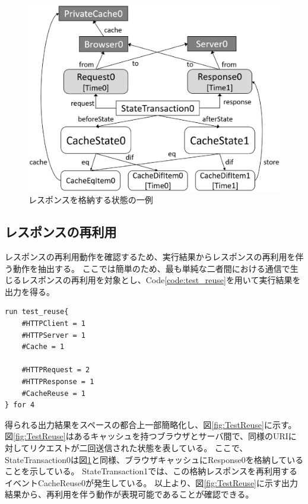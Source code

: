 \documentclass[12pt,a4paper]{jbook}
\begin{document}
\begin{figure}[htb]
\centering
\includegraphics[width=450pt]{./fig/TestStore.eps}
\caption{レスポンスを格納する状態の一例}
\label{fig:TestStore}
\end{figure}

\subsection{レスポンスの再利用}
レスポンスの再利用動作を確認するため、実行結果からレスポンスの再利用を伴う動作を抽出する。
ここでは簡単のため、最も単純な二者間における通信で生じるレスポンスの再利用を対象とし、Code\ref{code:test_reuse}を用いて実行結果を出力を得る。

\begin{lstlisting}[caption=レスポンスの再利用, label=code:test_reuse]
run test_reuse{
	#HTTPClient = 1
	#HTTPServer = 1
	#Cache = 1

	#HTTPRequest = 2
	#HTTPResponse = 1
	#CacheReuse = 1
} for 4
\end{lstlisting}

得られる出力結果をスペースの都合上一部簡略化し、図\ref{fig:TestReuse}に示す。
図\ref{fig:TestReuse}はあるキャッシュを持つブラウザとサーバ間で、同様のURIに対してリクエストが二回送信された状態を表している。
ここで、StateTransaction0は図\ref{fig:TestStore}と同様、ブラウザキャッシュにResponse0を格納していることを示している。
StateTransaction1では、この格納レスポンスを再利用するイベントCacheReuse0が発生している。
以上より、図\ref{fig:TestReuse}に示す出力結果から、再利用を伴う動作が表現可能であることが確認できる。
\end{document}
